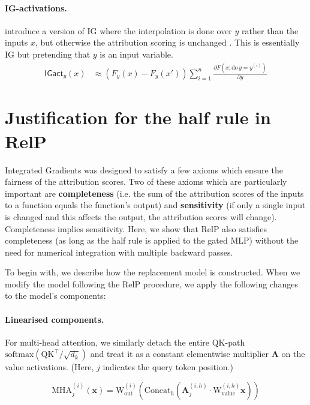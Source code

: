 \documentclass{article}
\theoremstyle{plain}
\theoremstyle{definition}
\theoremstyle{remark}
\begin{document}
\paragraph{IG-activations.} \citet{marks2025sparse} introduce a version of IG where the interpolation is done over $y$ rather than the inputs $x$, but otherwise the attribution scoring is unchanged . This is essentially IG but pretending that $y$ is an input variable.
\begin{align}
\mathsf{IGact}_y(x) &\approx (F_y(x) - F_y(x'))\sum_{i=1}^n\frac{\partial F(x; \mathrm{do}\,y=y^{(i)})}{\partial y}
\end{align}

\newpage
\section{Justification for the half rule in RelP}
\label{sec:half-rule}
Integrated Gradients \citep{sundararajan2017axiomatic} was designed to satisfy a few axioms which ensure the fairness of the attribution scores. Two of these axioms which are particularly important are \textbf{completeness} (i.e. the sum of the attribution scores of the inputs to a function equals the function's output) and \textbf{sensitivity} (if only a single input is changed and this affects the output, the attribution scores will change). Completeness implies sensitivity. Here, we show that RelP also satisfies completeness (as long as the half rule is applied to the gated MLP) without the need for numerical integration with multiple backward passes.

To begin with, we describe how the replacement model is constructed. When we modify the model following the RelP procedure, we apply the following changes to the model's components:

\paragraph{Linearised components.} For multi-head attention, we similarly detach the entire QK-path $\mathrm{softmax}(\mathrm{QK}^\top / \sqrt{d_k})$ and treat it as a constant elementwise multiplier $\mathbf{A}$ on the value activations. (Here, $j$ indicates the query token position.)

\begin{equation}\mathrm{MHA}^{(i)}_j(\mathbf{x}) = \mathrm{W}_\text{out}^{(i)}\left(\mathrm{Concat}_h\left(\mathbf{A}_j^{(i,h)} \cdot \mathrm{W}_\text{value}^{(i,h)}\mathbf{x}\right)\right)\end{equation}
\end{document}

